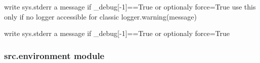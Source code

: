 \documentclass[a4paper,10pt,english]{sphinxmanual}
\begin{document}

\begin{fulllineitems}
\label{\detokenize{apidoc_src/src:src.debug.tofix}}
write sys.stderr a message if \_debug{[}-1{]}==True or optionaly force=True
use this only if no logger accessible for classic logger.warning(message)

\end{fulllineitems}


\begin{fulllineitems}
\label{\detokenize{apidoc_src/src:src.debug.write}}
write sys.stderr a message if \_debug{[}-1{]}==True or optionaly force=True

\end{fulllineitems}



\subsubsection{src.environment module}
\label{\detokenize{apidoc_src/src:src-environment-module}}\label{\detokenize{apidoc_src/src:module-src.environment}}
\end{document}
